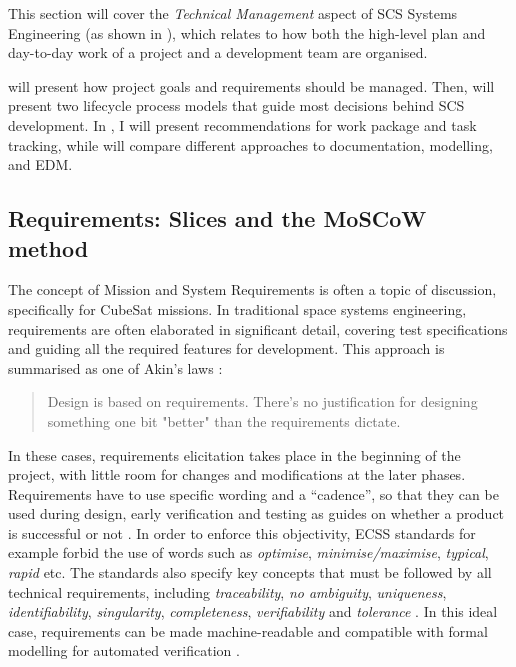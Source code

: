 \documentclass[a4paper,nobib,justified,final]{tufte-book}
\begin{document}
This section will cover the \emph{Technical Management} aspect of \acf{SCS} Systems Engineering (as shown in ), which relates to how both the high-level plan and day-to-day work of a project and a development team are organised.

 will present how project goals and requirements should be managed. Then,  will present two lifecycle process models that guide most decisions behind \acs{SCS} development. In , I will present recommendations for work package and task tracking, while  will compare different approaches to documentation, modelling, and \acf{EDM}.


\FloatBarrier
\subsection{Requirements: Slices and the MoSCoW method}
\label{sec:METHODOLOGY_requirements}

The concept of Mission and System Requirements is often a topic of discussion, specifically for CubeSat missions.
In traditional space systems engineering, requirements are often elaborated in significant detail, covering test specifications and guiding all the required features for development. This approach is summarised as one of Akin's laws \autocite{akinAkinLawsSpacecraft}:
\begin{quote}
	Design is based on requirements. There's no justification for designing something one bit "better" than the requirements dictate.
\end{quote}
In these cases, requirements elicitation takes place in the beginning of the project, with little room for changes and modifications at the later phases. Requirements have to use specific wording and a ``cadence'', so that they can be used during design, early verification and testing as guides on whether a product is successful or not \autocite{ECSS-E-ST-10-06C}. In order to enforce this objectivity, \acs{ECSS} standards for example forbid the use of words such as \emph{optimise}, \emph{minimise/maximise}, \emph{typical}, \emph{rapid} etc. The standards also specify key concepts that must be followed by all technical requirements, including \emph{traceability}, \emph{no ambiguity}, \emph{uniqueness}, \emph{identifiability}, \emph{singularity}, \emph{completeness}, \emph{verifiability} and \emph{tolerance} \cite{ECSS-E-ST-10-06C}. In this ideal case, requirements can be made machine-readable and compatible with formal modelling for automated verification \autocite{katisCaptureAnalyzeDiagnose2022}.
\end{document}
